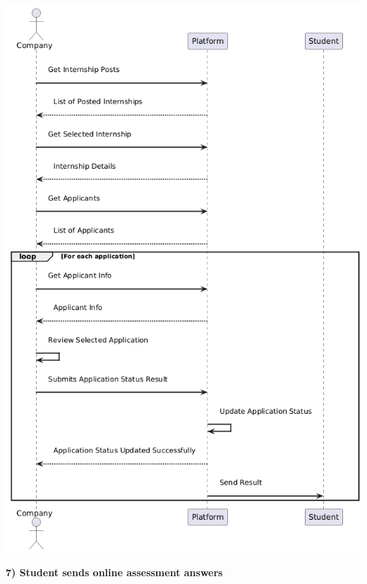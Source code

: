 \begin{center}
    \includegraphics[scale = 0.7]{Images/ImagesRASD/Company_to_manage_income_applications.png}
\end{center}

\newpage
\textbf{7) Student sends online assessment answers}\\


